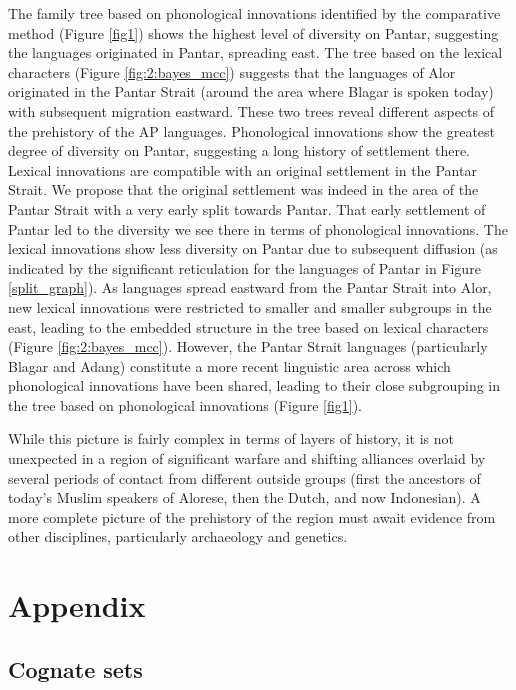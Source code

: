 The family tree based on phonological innovations identified by the comparative method (Figure \ref{fig1}) shows the highest level of diversity on Pantar, suggesting the languages originated in Pantar, spreading east. The tree based on the lexical characters (Figure \ref{fig:2:bayes_mcc}) suggests that the languages of Alor originated in the Pantar Strait (around the area where Blagar is spoken today) with subsequent migration eastward. These two trees reveal different aspects of the prehistory of the AP languages. Phonological innovations show the greatest degree of diversity on Pantar, suggesting a long history of settlement there. Lexical innovations are compatible with an original settlement in the Pantar Strait. We propose that the original settlement was indeed in the area of the Pantar Strait with a very early split towards Pantar. That early settlement of Pantar led to the diversity we see there in terms of phonological innovations. The lexical innovations show less diversity on Pantar due to subsequent diffusion (as indicated by 
the significant reticulation for the languages of Pantar in Figure \ref{split_graph}). As languages spread eastward from the Pantar Strait into Alor, new lexical innovations were restricted to smaller and smaller subgroups in the east, leading to the embedded structure in the tree based on lexical characters (Figure \ref{fig:2:bayes_mcc}). However, the Pantar Strait languages (particularly Blagar and Adang) constitute a more recent linguistic area across which phonological innovations have been shared, leading to their close subgrouping in the tree based on phonological innovations (Figure \ref{fig1}).  

While this picture is fairly complex in terms of layers of history, it is not unexpected in a region of significant warfare and shifting alliances overlaid by several periods of contact from different outside groups (first the ancestors of today's Muslim speakers of Alorese, then the Dutch, and now Indonesian). A more complete picture of the prehistory of the region must await evidence from other disciplines, particularly archaeology and genetics. 

\section*{Appendix}

\subsection*{Cognate sets}

